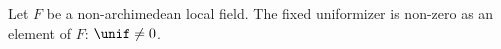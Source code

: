 Let $F$ be a non-archimedean local field. The fixed uniformizer is non-zero as an element of $F$: $\unif\neq0$.
